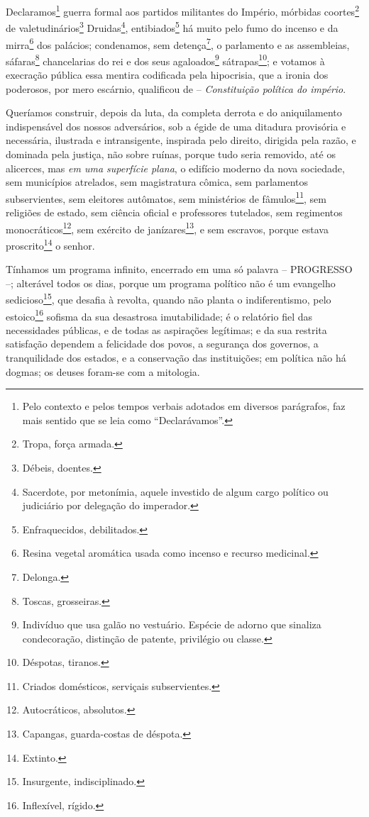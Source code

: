 Declaramos\footnote{Pelo contexto e pelos tempos verbais adotados em
  diversos parágrafos, faz mais sentido que se leia como
  ``Declarávamos''.} guerra formal aos partidos militantes do Império,
mórbidas coortes\footnote{Tropa, força armada.} de
valetudinários\footnote{Débeis, doentes.} Druidas\footnote{Sacerdote,
  por metonímia, aquele investido de algum cargo político ou judiciário
  por delegação do imperador.}, entibiados\footnote{Enfraquecidos,
  debilitados.} há muito pelo fumo do incenso e da mirra\footnote{Resina
  vegetal aromática usada como incenso e recurso medicinal.} dos
palácios; condenamos, sem detença\footnote{Delonga.}, o parlamento e as
assembleias, sáfaras\footnote{Toscas, grosseiras.} chancelarias do rei e
dos seus agaloados\footnote{Indivíduo que usa galão no vestuário.
  Espécie de adorno que sinaliza condecoração, distinção de patente,
  privilégio ou classe.} sátrapas\footnote{Déspotas, tiranos.}; e
votamos à execração pública essa mentira codificada pela hipocrisia, que
a ironia dos poderosos, por mero escárnio, qualificou de --
\emph{Constituição política do império}.

Queríamos construir, depois da luta, da completa derrota e do
aniquilamento indispensável dos nossos adversários, sob a égide de uma
ditadura provisória e necessária, ilustrada e intransigente, inspirada
pelo direito, dirigida pela razão, e dominada pela justiça, não sobre
ruínas, porque tudo seria removido, até os alicerces, mas \emph{em uma
superfície plana}, o edifício moderno da nova sociedade, sem municípios
atrelados, sem magistratura cômica, sem parlamentos subservientes, sem
eleitores autômatos, sem ministérios de fâmulos\footnote{Criados
  domésticos, serviçais subservientes.}, sem religiões de estado, sem
ciência oficial e professores tutelados, sem regimentos
monocráticos\footnote{Autocráticos, absolutos.}, sem exército de
janízares\footnote{Capangas, guarda-costas de déspota.}, e sem escravos,
porque estava proscrito\footnote{Extinto.} o senhor.

Tínhamos um programa infinito, encerrado em uma só palavra -- PROGRESSO
--; alterável todos os dias, porque um programa político não é um
evangelho sedicioso\footnote{Insurgente, indisciplinado.}, que desafia à
revolta, quando não planta o indiferentismo, pelo estoico\footnote{Inflexível,
  rígido.} sofisma da sua desastrosa imutabilidade; é o relatório fiel
das necessidades públicas, e de todas as aspirações legítimas; e da sua
restrita satisfação dependem a felicidade dos povos, a segurança dos
governos, a tranquilidade dos estados, e a conservação das instituições;
em política não há dogmas; os deuses foram-se com a mitologia.

